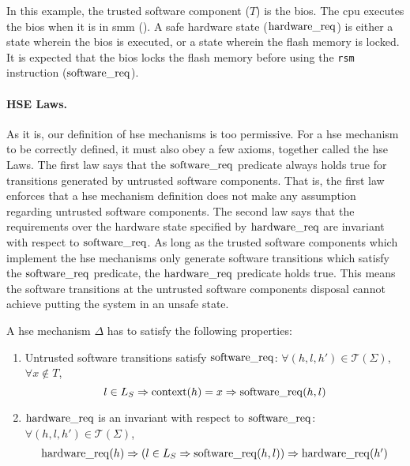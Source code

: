\begin{example}
  \label{example:speccert:flashdef}
  In this example, the trusted software component ($T$) is the \ac{bios}.
  The \ac{cpu} executes the \ac{bios} when it is in \ac{smm} ().
  A safe hardware state ($\mathrm{hardware\_req}$) is either a state wherein the
  \ac{bios} is executed, or a state wherein the flash memory is locked.
  It is expected that the \ac{bios} locks the flash memory before using the
  \texttt{rsm} instruction ($\mathrm{software\_req}$).
\end{example}

\paragraph{HSE Laws.}
%
As it is, our definition of \ac{hse} mechanisms is too permissive.
%
For a \ac{hse} mechanism to be correctly defined, it must also obey a few
axioms, together called the \ac{hse} Laws.
%
The first law says that the $\mathrm{software\_req}$ predicate always holds true
for transitions generated by untrusted software components.
%
That is, the first law enforces that a \ac{hse} mechanism definition does not
make any assumption regarding untrusted software components.
%
The second law says that the requirements over the hardware state specified by
$\mathrm{hardware\_req}$ are invariant with respect to $\mathrm{software\_req}$.
%
As long as the trusted software components which implement the \ac{hse}
mechanisms only generate software transitions which satisfy the
$\mathrm{software\_req}$ predicate, the $\mathrm{hardware\_req}$ predicate holds
true.
%
This means the software transitions at the untrusted software components
disposal cannot achieve putting the system in an unsafe state.

\begin{definition}
  \label{def:speccert:laws}
  A \ac{hse} mechanism $\Delta$ has to satisfy the following properties:
  \begin{enumerate}
  \item Untrusted software transitions satisfy $\mathrm{software\_req}$:
    $\forall (h, l, h') \in \mathcal{T}(\Sigma)$, $\forall x \not\in T$,
    \[
      l \in L_S \Rightarrow \mathrm{context}(h) = x \Rightarrow
      \mathrm{software\_req}(h, l)
    \]
  \item $\mathrm{hardware\_req}$ is an invariant with respect to
    $\mathrm{software\_req}$: $\forall (h, l, h') \in \mathcal{T}(\Sigma)$,
    \[
      \begin{array}{l} \mathrm{hardware\_req}(h) \Rightarrow (l \in L_S
        \Rightarrow \mathrm{software\_req}(h,l)) \Rightarrow
        \mathrm{hardware\_req}(h')
      \end{array}
    \]
  \end{enumerate}
\end{definition}

